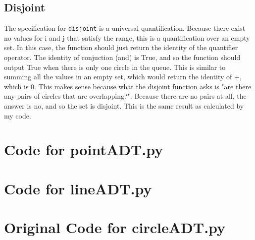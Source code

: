\documentclass[12pt]{article}
\begin{document}
\subsection{Disjoint}

The specification for {\tt disjoint} is a universal quantification. Because there exist no values for i and j that satisfy the range, this is a quantification over an empty set. In this case, the function should just return the identity of the quantifier operator. The identity of conjuction (and) is True, and so the function should output True when there is only one circle in the queue. This is similar to summing all the values in an empty set, which would return the identity of +, which is 0. This makes sense because what the disjoint function asks is "are there any pairs of circles that are overlapping?". Because there are no pairs at all, the answer is no, and so the set is disjoint. This is the same result as calculated by my code. 









\newpage

\appendix

\lstset{language=Python, basicstyle=\tiny,breaklines=true,showspaces=false,showstringspaces=false,breakatwhitespace=true}

\def\thesection{\Alph{section}} 

\section{Code for pointADT.py} \label{CircleSect}

\noindent 

\newpage

\section{Code for lineADT.py} \label{CircleSect}

\noindent 

\newpage

\section{Original Code for circleADT.py} \label{CircleSect}

\noindent 
\end{document}

